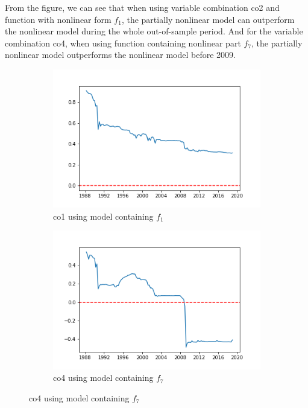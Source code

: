 \documentclass[a4paper,12pt,times,numbered,print,index]{report}
\numberwithin{equation}{section}
\begin{document}
From the figure, we can see that when using variable combination co2 and function with nonlinear form $f_1$, the partially nonlinear model can outperform the nonlinear model during the whole out-of-sample period. And for the variable combination co4, when using function containing nonlinear part $f_7$, the partially nonlinear model outperforms the nonlinear model before 2009. 

\begin{figure}[!htbp]
	\centering
	\caption{OOS Performance (Benchmark: Nonlinear Model)}
	\begin{subfigure}[b]{0.42\linewidth}
		\includegraphics[width=1.2\linewidth]{plots/co1_NLS_g1.png}
		\caption{co1 using model containing $f_1$}
	\end{subfigure}
	\begin{subfigure}[b]{0.42\linewidth}
		\includegraphics[width=1.2\linewidth]{plots/co4_NLS_g7.png}
		\caption{co4 using model containing $f_7$}
	\end{subfigure}
	\label{vsNL}
\end{figure}
\end{document}
